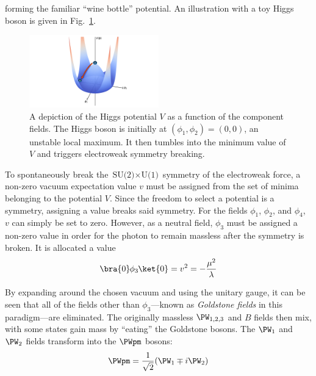 forming the familiar ``wine bottle'' potential. An illustration with a toy Higgs boson is given in Fig.~\ref{fig:higgs_potential}.

\begin{figure}[htbp]
    \centering
    \includegraphics[width=0.5\textwidth]{./figures/higgs_potential_pptx.pdf}  %
    \caption[A depiction of the Higgs potential $V$ as a function of the component fields]{A depiction of the Higgs potential $V$ as a function of the component fields. The Higgs boson is initially at $(\phi_1, \phi_2) = (\text{0}, \text{0})$, an unstable local maximum. It then tumbles into the minimum value of $V$ and triggers electroweak symmetry breaking.}
    \label{fig:higgs_potential}
\end{figure}

To spontaneously break the $\text{SU(2)} \times \text{U(1)}$ symmetry of the electroweak force, a non-zero vacuum expectation value $v$ must be assigned from the set of minima belonging to the potential $V$. Since the freedom to select a potential is a symmetry, assigning a value breaks said symmetry. For the fields $\phi_1$, $\phi_2$, and $\phi_4$, $v$ can simply be set to zero. However, as a neutral field, $\phi_3$ must be assigned a non-zero value in order for the photon to remain massless after the symmetry is broken. It is allocated a value
\begin{equation}
    \bra{0} \mkern-1mu \phi_3 \mkern-1mu \ket{0} = v^2 = -\frac{\mu^2}{\lambda}
    \label{eq:higgs_vev}
\end{equation}

By expanding \HiggsField around the chosen vacuum and using the unitary gauge, it can be seen that all of the fields other than $\phi_3$---known as \emph{Goldstone fields} in this paradigm---are eliminated. The originally massless $\PW_{1,2,3}$ and $B$ fields then mix, with some states gain mass by ``eating'' the Goldstone bosons. The $\PW_1$ and $\PW_2$ fields transform into the $\PWpm$ bosons:
\begin{equation}
    \PWpm = \frac{1}{\sqrt{2}} (\PW_1 \mp i\PW_2)
    \label{eq:EWSB_W}
\end{equation}

